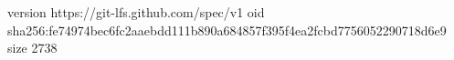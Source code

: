 version https://git-lfs.github.com/spec/v1
oid sha256:fe74974bec6fc2aaebdd111b890a684857f395f4ea2fcbd7756052290718d6e9
size 2738
